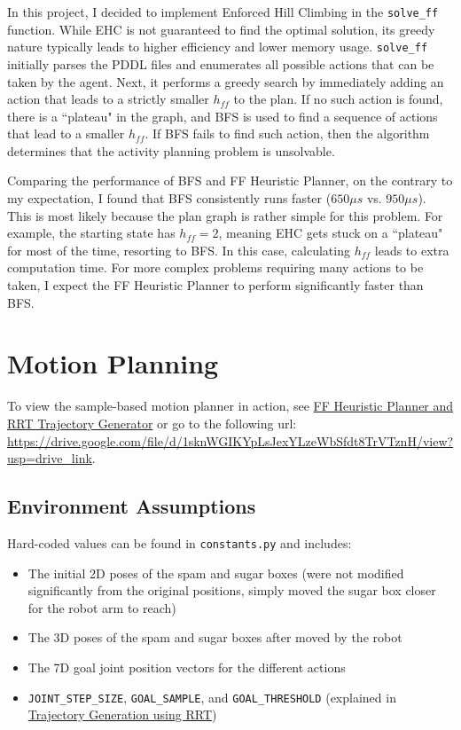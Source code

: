 \documentclass{article}
\begin{document}
In this project, I decided to implement Enforced Hill Climbing in the \texttt{solve\_ff} function. While EHC is not guaranteed to find the optimal solution, its greedy nature typically leads to higher efficiency and lower memory usage. \texttt{solve\_ff} initially parses the PDDL files and enumerates all possible actions that can be taken by the agent. Next, it performs a greedy search by immediately adding an action that leads to a strictly smaller $h_{ff}$ to the plan. If no such action is found, there is a ``plateau" in the graph, and BFS is used to find a sequence of actions that lead to a smaller $h_{ff}$. If BFS fails to find such action, then the algorithm determines that the activity planning problem is unsolvable.

Comparing the performance of BFS and FF Heuristic Planner, on the contrary to my expectation, I found that BFS consistently runs faster ($650\mu s$ vs. $950\mu s$). This is most likely because the plan graph is rather simple for this problem. For example, the starting state has $h_{ff}=2$, meaning EHC gets stuck on a ``plateau" for most of the time, resorting to BFS. In this case, calculating $h_{ff}$ leads to extra computation time. For more complex problems requiring many actions to be taken, I expect the FF Heuristic Planner to perform significantly faster than BFS.

\section{Motion Planning}

To view the sample-based motion planner in action, see \href{https://drive.google.com/file/d/1sknWGIKYpLsJexYLzeWbSfdt8TrVTznH/view?usp=sharing}{FF Heuristic Planner and RRT Trajectory Generator} or go to the following url: \url{https://drive.google.com/file/d/1sknWGIKYpLsJexYLzeWbSfdt8TrVTznH/view?usp=drive_link}.

\subsection{Environment Assumptions}

Hard-coded values can be found in \texttt{constants.py} and includes:
\begin{itemize}
    \item The initial 2D poses of the spam and sugar boxes (were not modified significantly from the original positions, simply moved the sugar box closer for the robot arm to reach)
    \item The 3D poses of the spam and sugar boxes after moved by the robot
    \item The 7D goal joint position vectors for the different actions
    \item \texttt{JOINT\_STEP\_SIZE}, \texttt{GOAL\_SAMPLE}, and \texttt{GOAL\_THRESHOLD} (explained in \href{sec:rrt}{Trajectory Generation using RRT})
\end{itemize}
\end{document}
